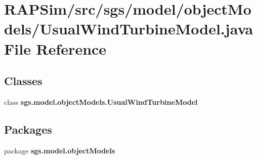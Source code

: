 \section{R\-A\-P\-Sim/src/sgs/model/object\-Models/\-Usual\-Wind\-Turbine\-Model.java File Reference}
\label{_usual_wind_turbine_model_8java}
\subsection*{Classes}
\begin{DoxyCompactItemize}
\item 
class {\bf sgs.\-model.\-object\-Models.\-Usual\-Wind\-Turbine\-Model}
\end{DoxyCompactItemize}
\subsection*{Packages}
\begin{DoxyCompactItemize}
\item 
package {\bf sgs.\-model.\-object\-Models}
\end{DoxyCompactItemize}
